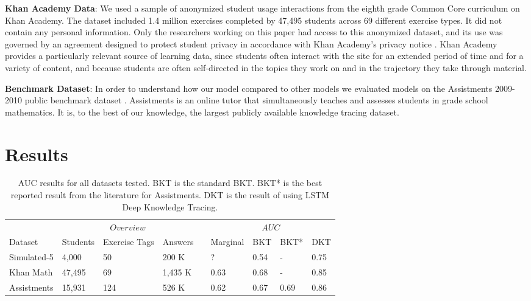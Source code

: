 \textbf{Khan Academy Data}: We used a sample of anonymized student usage interactions from the eighth grade Common Core curriculum on Khan Academy. The dataset included 1.4 million exercises completed by 47,495 students across 69 different exercise types. It did not contain any personal information. Only the researchers working on this paper had access to this anonymized dataset, and its use was governed by an agreement designed to protect student privacy in accordance with Khan Academy’s privacy notice \cite{KAprivacy}. Khan Academy provides a particularly relevant source of learning data, since students often interact with the site for an extended period of time and for a variety of content, and because students are often self-directed in the topics they work on and in the trajectory they take through material.

\textbf{Benchmark Dataset}: In order to understand how our model compared to other models we evaluated models on the Assistments 2009-2010 public benchmark dataset \cite{feng2009addressing} %
. Assistments is an online tutor that simultaneously teaches and assesses students in grade school mathematics. It is, to the best of our knowledge, the largest publicly available knowledge tracing dataset.

\section{Results}\label{sec results}

\begin{table}\centering
{}
\begin{tabular}{@{}llllcllll@{}}
\toprule
& \multicolumn{3}{c}{$Overview$} & \phantom{abc} &
 \multicolumn{4}{c}{$AUC$} \\
\cmidrule{2-4} 
\cmidrule{6-9}  
Dataset & Students & Exercise Tags & Answers && Marginal & BKT & BKT* & DKT \\ 
\midrule
Simulated-5 & 4,000 & 50 & 200 K && ? & 0.54 & - & 0.75 \\
Khan Math  & 47,495 & 69 & 1,435 K && 0.63 & 0.68 & - & 0.85 \\
Assistments & 15,931 & 124 & 526 K && 0.62 & 0.67 & 0.69 & 0.86 \\
\bottomrule
\end{tabular}
\caption[Knowledge tracing accuracy]{AUC results for all datasets tested. BKT is the standard BKT. BKT* is the best reported result from the literature for Assistments. DKT is the result of using LSTM Deep Knowledge Tracing.
\label{table:results}
}

\end{table}

